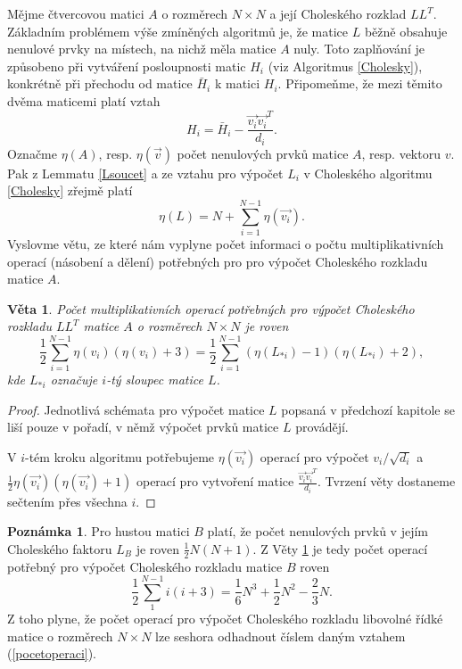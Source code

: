 \documentclass[11pt,american,czech,oneside]{book}
\theoremstyle{plain}
\newtheorem{theorem}{Věta}
\theoremstyle{definition}
\newtheorem{remark}{Poznámka}
\begin{document}
Mějme čtvercovou matici $A$ o rozměrech $N\times N$ a její Choleského rozklad $LL^T$. Základním problémem výše zmíněných algoritmů je, že matice $L$ běžně obsahuje nenulové prvky na místech, na nichž měla matice $A$ nuly. Toto zaplňování je způsobeno při vytváření posloupnosti matic $H_i$ (viz Algoritmus \ref{Cholesky}), konkrétně při přechodu od matice $\bar{H}_i$ k matici $H_i$. Připomeňme, že mezi těmito dvěma maticemi platí vztah
\[
H_i = \bar{H}_i - \frac{\vec{v_i}\vec{v_i}^T}{d_i}.
\]
Označme $\eta(A)$, resp. $\eta(\vec{v})$ počet nenulových prvků matice $A$, resp. vektoru $v$. Pak z Lemmatu \ref{Lsoucet} a ze vztahu pro výpočet $L_i$ v Choleského algoritmu \ref{Cholesky} zřejmě platí
\[
\eta(L) = N + \sum_{i=1}^{N-1}\eta(\vec{v_i}).
\]
Vyslovme větu, ze které nám vyplyne počet informaci o počtu multiplikativních operací (násobení a dělení) potřebných pro pro výpočet Choleského rozkladu matice $A$.
\begin{theorem}
\label{Cholesky_operace}
  Počet multiplikativních operací potřebných pro výpočet Choleského rozkladu $LL^T$ matice $A$ o rozměrech $N \times N$ je roven
  \[
  \frac12\sum_{i=1}^{N-1}\eta(v_i)\left(\eta(v_i)+3\right)=
  \frac12\sum_{i=1}^{N-1}\left(\eta(L_{*i})-1\right)\left(\eta(L_{*i})+2\right),
  \]
  kde $L_{*i}$ označuje $i$-tý sloupec matice $L$.
\end{theorem}
\begin{proof}
  Jednotlivá schémata pro výpočet matice $L$ popsaná v předchozí kapitole se liší pouze v pořadí, v němž výpočet prvků matice $L$ provádějí.

  V $i$-tém kroku algoritmu potřebujeme $\eta(\vec{v_i})$ operací pro výpočet $v_i/\sqrt{d_i}$ a $\frac12\eta(\vec{v_i})\left(\eta(\vec{v_i})+1\right)$ operací pro vytvoření matice $\frac{\vec{v_i}\vec{v_i}^T}{d_i}$. Tvrzení věty dostaneme sečtením přes všechna $i$.
\end{proof}

\begin{remark}
Pro hustou matici $B$ platí, že počet nenulových prvků v jejím Choleského faktoru $L_B$ je roven $\frac12 N(N+1)$.
Z Věty \ref{Cholesky_operace} je tedy počet operací potřebný pro výpočet Choleského rozkladu matice $B$ roven
\begin{equation}\label{pocetoperaci}
  \frac12 \sum_{1}^{N-1}i(i+3) = \frac16 N^3 + \frac12 N^2 - \frac23 N.
\end{equation}
Z toho plyne, že počet operací pro výpočet Choleského rozkladu libovolné řídké matice o rozměrech $N \times N $ lze seshora odhadnout číslem daným vztahem (\ref{pocetoperaci}).
\end{remark}
\end{document}
